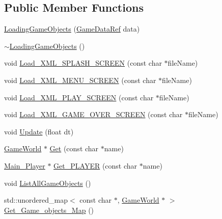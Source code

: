 \subsection*{Public Member Functions}
\begin{DoxyCompactItemize}
\item 
\hyperlink{classSekander_1_1LoadingGameObjects_a05bf4cf5351ede9b00a3c161576c82f1}{Loading\+Game\+Objects} (\hyperlink{namespaceSekander_a1d69b002ba2d23020901c28f0def5e16}{Game\+Data\+Ref} data)
\item 
\hyperlink{classSekander_1_1LoadingGameObjects_ac0a7e1349776ee6cb266f3c3c8cae4ba}{$\sim$\+Loading\+Game\+Objects} ()
\item 
void \hyperlink{classSekander_1_1LoadingGameObjects_a01a3bccc8f858e5cb35d18b58602f3ac}{Load\+\_\+\+X\+M\+L\+\_\+\+S\+P\+L\+A\+S\+H\+\_\+\+S\+C\+R\+E\+EN} (const char $\ast$file\+Name)
\item 
void \hyperlink{classSekander_1_1LoadingGameObjects_ad798b8479b0138f04196e398ab2e2d67}{Load\+\_\+\+X\+M\+L\+\_\+\+M\+E\+N\+U\+\_\+\+S\+C\+R\+E\+EN} (const char $\ast$file\+Name)
\item 
void \hyperlink{classSekander_1_1LoadingGameObjects_a1d4c40b9fe4b0608fd8d40182d37b6d5}{Load\+\_\+\+X\+M\+L\+\_\+\+P\+L\+A\+Y\+\_\+\+S\+C\+R\+E\+EN} (const char $\ast$file\+Name)
\item 
void \hyperlink{classSekander_1_1LoadingGameObjects_a9b1a1dfecbed28a4eef90aa53953cbde}{Load\+\_\+\+X\+M\+L\+\_\+\+G\+A\+M\+E\+\_\+\+O\+V\+E\+R\+\_\+\+S\+C\+R\+E\+EN} (const char $\ast$file\+Name)
\item 
void \hyperlink{classSekander_1_1LoadingGameObjects_a5b665e8cfe17852dad38dd8231004d62}{Update} (float dt)
\item 
\hyperlink{classSekander_1_1GameWorld}{Game\+World} $\ast$ \hyperlink{classSekander_1_1LoadingGameObjects_a489930b1251e3303e1c0d5e7aa90136d}{Get} (const char $\ast$name)
\item 
\hyperlink{classSekander_1_1Main__Player}{Main\+\_\+\+Player} $\ast$ \hyperlink{classSekander_1_1LoadingGameObjects_a6cc5ff99c7f8853a0bb5d002f130ed2d}{Get\+\_\+\+P\+L\+A\+Y\+ER} (const char $\ast$name)
\item 
void \hyperlink{classSekander_1_1LoadingGameObjects_ae13ea38a08bb58ac90279418aac58600}{List\+All\+Game\+Objects} ()
\item 
std\+::unordered\+\_\+map$<$ const char $\ast$, \hyperlink{classSekander_1_1GameWorld}{Game\+World} $\ast$ $>$ \hyperlink{classSekander_1_1LoadingGameObjects_a0b894ea1b1abd089c3e7c5934344ae14}{Get\+\_\+\+Game\+\_\+objects\+\_\+\+Map} ()

\end{DoxyCompactItemize}
